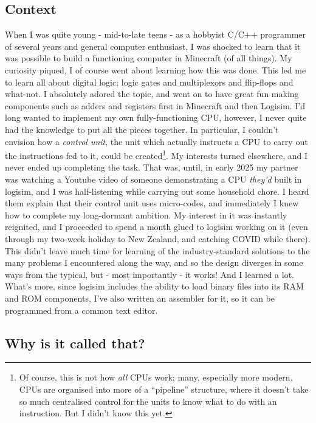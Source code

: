 \documentclass{article}
\begin{document}
\subsection{Context}

When I was quite young - mid-to-late teens - as a hobbyist C/C++ programmer of several years and general computer enthusiast, I was shocked to learn that it was possible to build a functioning computer in Minecraft (of all things). My curiosity piqued, I of course went about learning how this was done. This led me to learn all about digital logic; logic gates and multiplexors and flip-flops and what-not. I absolutely adored the topic, and went on to have great fun making components such as adders and registers first in Minecraft and then Logisim. I'd long wanted to implement my own fully-functioning CPU, however, I never quite had the knowledge to put all the pieces together. In particular, I couldn't envision how a \textit{control unit}, the unit which actually instructs a CPU to carry out the instructions fed to it, could be created\footnote{Of course, this is not how \textit{all} CPUs work; many, especially more modern, CPUs are organised into more of a ``pipeline'' structure, where it doesn't take so much centralised control for the units to know what to do with an instruction. But I didn't know this yet.}. My interests turned elsewhere, and I never ended up completing the task. That was, until, in early 2025 my partner was watching a Youtube video of someone demonstrating a CPU \textit{they'd} built in logisim, and I was half-listening while carrying out some household chore. I heard them explain that their control unit uses micro-codes, and immediately I knew how to complete my long-dormant ambition. My interest in it was instantly reignited, and I proceeded to spend a month glued to logisim working on it (even through my two-week holiday to New Zealand, and catching COVID while there). This didn't leave much time for learning of the industry-standard solutions to the many problems I encountered along the way, and so the design diverges in some ways from the typical, but - most importantly - it works! And I learned a lot. What's more, since logisim includes the ability to load binary files into its RAM and ROM components, I've also written an assembler for it, so it can be programmed from a common text editor.

\newpage
\subsection{Why is it called that?}
\end{document}
